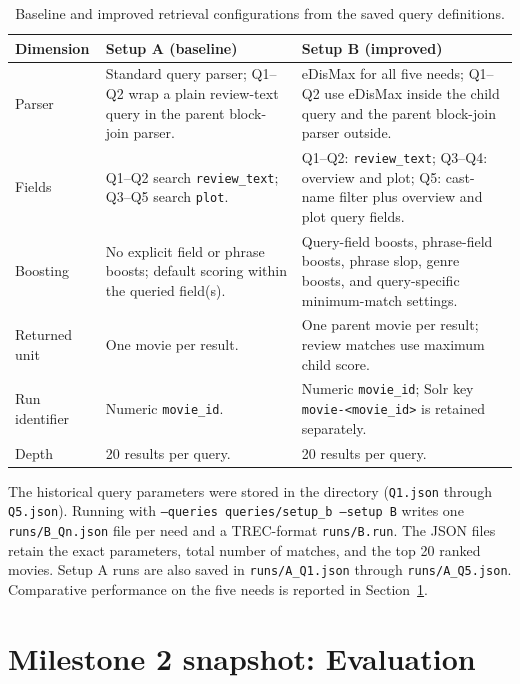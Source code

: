 \documentclass[sigconf]{acmart}
\begin{document}
\begin{table}[t]
\centering
\setlength{\tabcolsep}{3pt}
\caption{Baseline and improved retrieval configurations from the saved query definitions.}
\label{tab:setup-ab}
\small
\begin{tabular}{p{1.3cm}p{2.3cm}p{4.2cm}}
\hline
Dimension & Setup A (baseline) & Setup B (improved) \\
\hline
Parser & Standard query parser; Q1--Q2 wrap a plain review-text query in the parent block-join parser. & eDisMax for all five needs; Q1--Q2 use eDisMax inside the child query and the parent block-join parser outside. \\
Fields & Q1--Q2 search \texttt{review\_text}; Q3--Q5 search \texttt{plot}. & Q1--Q2: \texttt{review\_text}; Q3--Q4: overview and plot; Q5: cast-name filter plus overview and plot query fields. \\
Boosting & No explicit field or phrase boosts; default scoring within the queried field(s). & Query-field boosts, phrase-field boosts, phrase slop, genre boosts, and query-specific minimum-match settings. \\
Returned unit & One movie per result. & One parent movie per result; review matches use maximum child score. \\
Run identifier & Numeric \texttt{movie\_id}. & Numeric \texttt{movie\_id}; Solr key \texttt{movie-<movie\_id>} is retained separately. \\
Depth & 20 results per query. & 20 results per query. \\
\hline
\end{tabular}
\end{table}

The historical query parameters were stored in the  directory
(\texttt{Q1.json} through \texttt{Q5.json}). Running 
with \texttt{--queries queries/setup\_b --setup B} writes one \texttt{runs/B\_Qn.json}
file per need and a TREC-format \texttt{runs/B.run}.
The JSON files retain the exact parameters, total number of matches, and the top
20 ranked movies. Setup A runs are also saved in \texttt{runs/A\_Q1.json} through
\texttt{runs/A\_Q5.json}. Comparative performance on the five needs is reported in
Section~\ref{sec:evaluation}.

\section{Milestone 2 snapshot: Evaluation}
\label{sec:evaluation}
\end{document}
